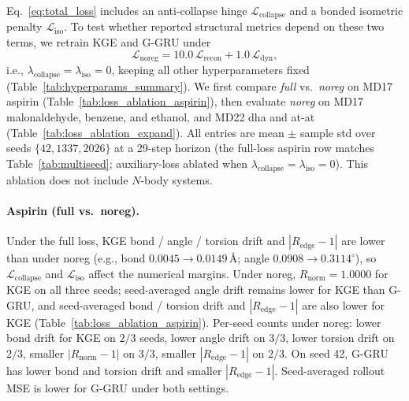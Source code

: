 \documentclass{article}
\newcommand{\GKE}{\textsc{KGE}}
\newcommand{\GGRU}{\textsc{G-GRU}}
\begin{document}
Eq.~\eqref{eq:total_loss} includes an anti-collapse hinge $\mathcal{L}_{\text{collapse}}$ and a bonded isometric penalty $\mathcal{L}_{\text{iso}}$.
To test whether reported structural metrics depend on these two terms, we retrain \GKE{} and \GGRU{} under
\begin{equation}
  \label{eq:noreg_loss}
  \mathcal{L}_{\text{noreg}} = 10.0\,\mathcal{L}_{\text{recon}} + 1.0\,\mathcal{L}_{\text{dyn}},
\end{equation}
i.e., $\lambda_{\text{collapse}}=\lambda_{\text{iso}}=0$, keeping all other hyperparameters fixed (Table~\ref{tab:hyperparams_summary}).
We first compare \emph{full} vs.\ \emph{noreg} on MD17 aspirin (Table~\ref{tab:loss_ablation_aspirin}), then evaluate \emph{noreg} on MD17 malonaldehyde, benzene, and ethanol, and MD22 dha and at-at (Table~\ref{tab:loss_ablation_expand}).
All entries are mean $\pm$ sample std over seeds $\{42, 1337, 2026\}$ at a 29-step horizon (the full-loss aspirin row matches Table~\ref{tab:multiseed}; auxiliary-loss ablated when $\lambda_{\text{collapse}}=\lambda_{\text{iso}}=0$).
This ablation does not include $N$-body systems.

\paragraph{Aspirin (full vs.\ noreg).}
Under the full loss, \GKE{} bond / angle / torsion drift and $|R_{\text{edge}}-1|$ are lower than under noreg (e.g., bond $0.0045\to0.0149$\,\AA; angle $0.0908\to0.3114^\circ$), so $\mathcal{L}_{\text{collapse}}$ and $\mathcal{L}_{\text{iso}}$ affect the numerical margins.
Under noreg, $R_{\text{norm}}=1.0000$ for \GKE{} on all three seeds; seed-averaged angle drift remains lower for \GKE{} than \GGRU{}, and seed-averaged bond / torsion drift and $|R_{\text{edge}}-1|$ are also lower for \GKE{} (Table~\ref{tab:loss_ablation_aspirin}).
Per-seed counts under noreg: lower bond drift for \GKE{} on $2/3$ seeds, lower angle drift on $3/3$, lower torsion drift on $2/3$, smaller $|R_{\text{norm}}-1|$ on $3/3$, smaller $|R_{\text{edge}}-1|$ on $2/3$.
On seed 42, \GGRU{} has lower bond and torsion drift and smaller $|R_{\text{edge}}-1|$.
Seed-averaged rollout MSE is lower for \GGRU{} under both settings.
\end{document}
